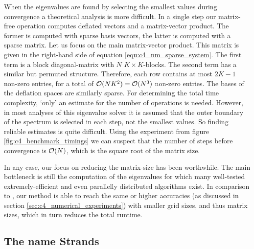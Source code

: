 When the eigenvalues are found by selecting the smallest values during convergence a theoretical analysis is more difficult. In a single step our matrix-free operation computes deflated vectors and a matrix-vector product. The former is computed with sparse basis vectors, the latter is computed with a sparse matrix. Let us focus on the main matrix-vector product. This matrix is given in the right-hand side of equation \eqref{equ:c4_nm_sparse_system}. The first term is a block diagonal-matrix with $N$ $K\times K$-blocks. The second term has a similar but permuted structure. Therefore, each row contains at most $2K - 1$ non-zero entries, for a total of $\operatorname{\mathcal{O}}(N K^2) = \operatorname{\mathcal{O}}(N^3)$ non-zero entries. The bases of the deflation spaces are similarly sparse. For determining the total time complexity, `only' an estimate for the number of operations is needed. However, in most analyses of this eigenvalue solver it is assumed that the outer boundary of the spectrum is selected in each step, not the smallest values. So finding reliable estimates is quite difficult. Using the experiment from figure \ref{fig:c4_benchmark_timings} we can suspect that the number of steps before convergence is $\operatorname{\mathcal{O}}(N)$, which is the square root of the matrix size.

In any case, our focus on reducing the matrix-size has been worthwhile. The main bottleneck is still the computation of the eigenvalues for which many well-tested extremely-efficient and even parallelly distributed algorithms exist. In comparison to \cite{wang_new_2009}, our method is able to reach the same or higher accuracies (as discussed in section \ref{sec:c4_numerical_experiments}) with smaller grid sizes, and thus matrix sizes, which in turn reduces the total runtime.

\subsection{The name Strands}

